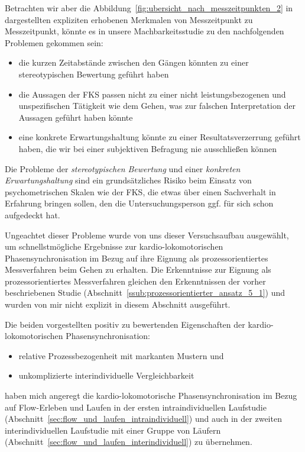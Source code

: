 Betrachten wir aber die Abbildung~\ref{fig:ubersicht_nach_messzeitpunkten_2} in dargestellten expliziten erhobenen Merkmalen von Messzeitpunkt zu Messzeitpunkt, könnte es in unsere Machbarkeitsstudie zu den nachfolgenden Problemen gekommen sein:
\begin{itemize}
	
	\item die kurzen Zeitabstände zwischen den Gängen könnten zu einer stereotypischen Bewertung geführt haben
	
	\item die Aussagen der \ac{FKS} passen nicht zu einer nicht leistungsbezogenen und unspezifischen Tätigkeit wie dem Gehen, was zur falschen Interpretation der Aussagen geführt haben könnte
	
	\item eine konkrete Erwartungshaltung könnte zu einer Resultatsverzerrung geführt haben, die wir bei einer subjektiven Befragung nie ausschließen können
\end{itemize}

Die Probleme der \emph{stereotypischen Bewertung} und einer \emph{konkreten Erwartungshaltung} sind ein grundsätzliches Risiko beim Einsatz von psychometrischen Skalen wie der \ac{FKS}, die etwas über einen Sachverhalt in Erfahrung bringen sollen, den die Untersuchungsperson ggf. für sich schon aufgedeckt hat.

Ungeachtet dieser Probleme wurde von uns dieser Versuchsaufbau ausgewählt, um schnellstmögliche Ergebnisse zur kardio-lokomotorischen Phasensynchronisation im Bezug auf ihre Eignung als prozessorientiertes Messverfahren beim Gehen zu erhalten. Die Erkenntnisse zur Eignung als prozessorientiertes Messverfahren gleichen den Erkenntnissen der vorher beschriebenen Studie (Abschnitt~\ref{ssub:prozessorientierter_ansatz_5_1}) und wurden von mir nicht explizit in diesem Abschnitt ausgeführt.

Die beiden vorgestellten positiv zu bewertenden Eigenschaften der kardio-lokomotorischen Phasensynchronisation: 
\begin{itemize}
	
	\item relative Prozessbezogenheit mit markanten Mustern und
	
	\item unkomplizierte interindividuelle Vergleichbarkeit
\end{itemize}

haben mich angeregt die kardio-lokomotorische Phasensynchronisation im Bezug auf Flow-Erleben und Laufen in der ersten intraindividuellen Laufstudie (Abschnitt~\ref{sec:flow_und_laufen_intraindividuell}) und auch in der zweiten interindividuellen Laufstudie mit einer Gruppe von Läufern (Abschnitt~\ref{sec:flow_und_laufen_interindividuell}) zu übernehmen.

